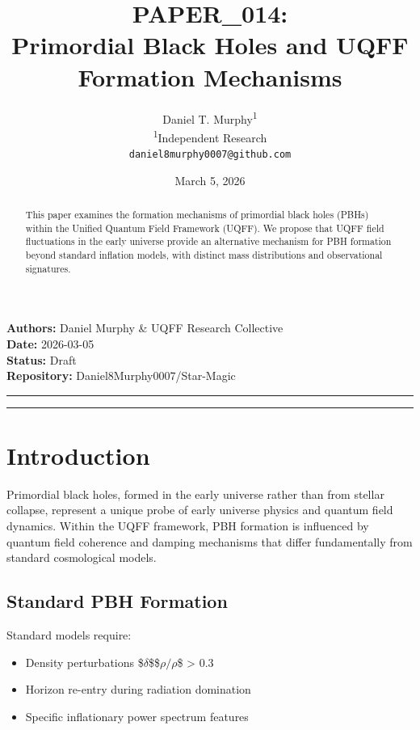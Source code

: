 \documentclass[12pt,a4paper]{article}
\title{\textbf{PAPER\_014: \\ Primordial Black Holes and UQFF Formation Mechanisms}}
\author{
Daniel T. Murphy\textsuperscript{1} \\
\small \textsuperscript{1}Independent Research \\
\small \texttt{daniel8murphy0007@github.com}
}
\date{March 5, 2026}
\begin{document}
\maketitle

\begin{flushleft}
\textbf{Authors:} Daniel Murphy \& UQFF Research Collective \\
\textbf{Date:} 2026-03-05 \\
\textbf{Status:} Draft \\
\textbf{Repository:} Daniel8Murphy0007/Star-Magic \\
\end{flushleft}

\medskip\hrule\medskip

\begin{abstract}
This paper examines the formation mechanisms of primordial black holes (PBHs) within the Unified Quantum Field Framework (UQFF). We propose that UQFF field fluctuations in the early universe provide an alternative mechanism for PBH formation beyond standard inflation models, with distinct mass distributions and observational signatures.
\end{abstract}

\medskip\hrule\medskip

\section{Introduction}

Primordial black holes, formed in the early universe rather than from stellar collapse, represent a unique probe of early universe physics and quantum field dynamics. Within the UQFF framework, PBH formation is influenced by quantum field coherence and damping mechanisms that differ fundamentally from standard cosmological models.

\subsection{Standard PBH Formation}

Standard models require:

\begin{itemize}
  \item Density perturbations \$$\delta$\$\$$\rho$$/$$\rho$\$ > 0.3
  \item Horizon re-entry during radiation domination
  \item Specific inflationary power spectrum features
\end{itemize}
\end{document}
